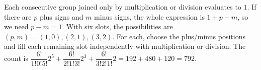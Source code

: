 Each consecutive group joined only by multiplication or division evaluates to $1$. If there are $p$ plus signs and $m$ minus signs, the whole expression is $1+p-m$, so we need $p-m=1$. With six slots, the possibilities are $(p,m)=(1,0),(2,1),(3,2)$. For each, choose the plus/minus positions and fill each remaining slot independently with multiplication or division. The count is $\dfrac{6!}{1!0!5!}2^5+\dfrac{6!}{2!1!3!}2^3+\dfrac{6!}{3!2!1!}2=192+480+120=\boxed{792}$.
